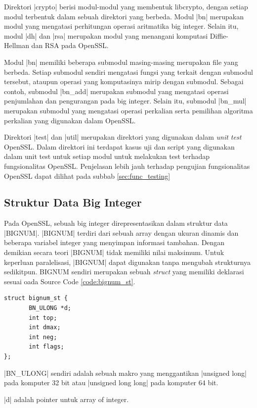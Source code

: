     Direktori |crypto| berisi modul-modul yang membentuk libcrypto, dengan setiap modul terbentuk dalam sebuah direktori yang berbeda. Modul |bn| merupakan modul yang mengatasi perhitungan operasi aritmatika big integer. Selain itu, modul |dh| dan |rsa| merupakan modul yang menangani komputasi Diffie-Hellman dan RSA pada OpenSSL.

    Modul |bn| memiliki beberapa submodul masing-masing merupakan file yang berbeda. Setiap submodul sendiri mengatasi fungsi yang terkait dengan submodul tersebut, ataupun operasi yang komputasinya mirip dengan submodul. Sebagai contoh, submodul |bn_add| merupakan submodul yang mengatasi operasi penjumlahan dan pengurangan pada big integer. Selain itu, submodul |bn_mul| merupakan submodul yang mengatasi operasi perkalian serta pemilihan algoritma perkalian yang digunakan dalam OpenSSL.

    Direktori |test| dan |util| merupakan direktori yang digunakan dalam \textit{unit test} OpenSSL. Dalam direktori ini terdapat kasus uji dan script yang digunakan dalam unit test untuk setiap modul untuk melakukan test terhadap fungsionalitas OpenSSL. Penjelasan lebih jauh terhadap pengujian fungsionalitas OpenSSL dapat dilihat pada subbab \ref{sec:func_testing}

  \subsection{Struktur Data Big Integer} \label{sec:bignum_struct}
    Pada OpenSSL, sebuah big integer direpresentasikan dalam struktur data |BIGNUM|. |BIGNUM| terdiri dari sebuah array dengan ukuran dinamis dan beberapa variabel integer yang menyimpan informasi tambahan. Dengan demikian secara teori |BIGNUM| tidak memiliki nilai maksimum. Untuk keperluan paralelisasi, |BIGNUM| dapat digunakan tanpa mengubah strukturnya sedikitpun. BIGNUM sendiri merupakan sebuah \textit{struct} yang memiliki deklarasi sesuai oada Source Code \ref{code:bignum_st}.

    \begin{lstlisting}[caption={Struktur Data bignum}, label={code:bignum_st}]
struct bignum_st {
       BN_ULONG *d;
       int top;
       int dmax;
       int neg;
       int flags;
};
    \end{lstlisting}

    |BN_ULONG| sendiri adalah sebuah makro yang menggantikan |unsigned long| pada komputer 32 bit atau |unsigned long long| pada komputer 64 bit.

    |d| adalah pointer untuk array of integer.

